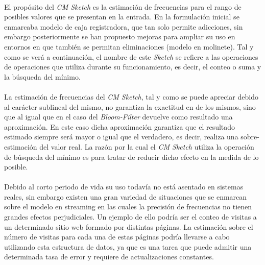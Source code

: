 \documentclass{subfiles}
\begin{document}
      \paragraph{}
      El propósito del \emph{CM Sketch} es la estimación de frecuencias para el rango de posibles valores que se presentan en la entrada. En la formulación inicial se enmarcaba modelo de caja registradora, que tan solo permite adicciones, sin embargo posteriormente se han propuesto mejoras para ampliar su uso en entornos en que también se permitan eliminaciones (modelo en molinete). Tal y como se verá a continuación, el nombre de este \emph{Sketch} se refiere a las operaciones de operaciones que utiliza durante su funcionamiento, es decir, el conteo o suma y la búsqueda del mínimo.

      \paragraph{}
      La estimación de frecuencias del \emph{CM Sketch}, tal y como se puede apreciar debido al carácter sublineal del mismo, no garantiza la exactitud en de los mismos, sino que al igual que en el caso del \emph{Bloom-Filter} devuelve como resultado una aproximación. En este caso dicha aproximación garantiza que el resultado estimado siempre será mayor o igual que el verdadero, es decir, realiza una sobre-estimación del valor real. La razón por la cual el \emph{CM Sketch} utiliza la operación de búsqueda del mínimo es para tratar de reducir dicho efecto en la medida de lo posible.

      \paragraph{}
      Debido al corto periodo de vida su uso todavía no está asentado en sistemas reales, sin embargo existen una gran variedad de situaciones que se enmarcan sobre el modelo en streaming en las cuales la precisión de frecuencias no tienen grandes efectos perjudiciales. Un ejemplo de ello podría ser el conteo de visitas a un determinado sitio web formado por distintas páginas. La estimación sobre el número de visitas para cada una de estas páginas podría llevarse a cabo utilizando esta estructura de datos, ya que es una tarea que puede admitir una determinada tasa de error y requiere de actualizaciones constantes.
\end{document}
